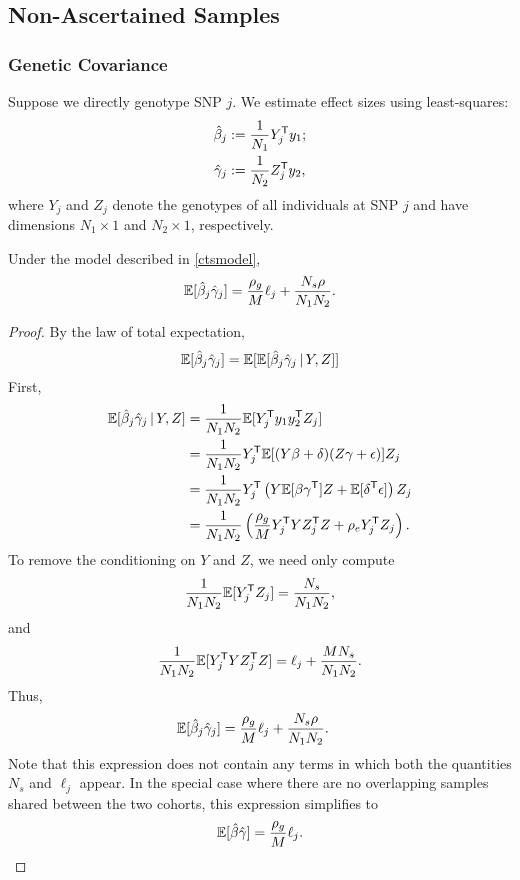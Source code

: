 \documentclass[11pt]{article}
\numberwithin{equation}{section}
\numberwithin{definition}{section}
\numberwithin{thm}{section}
\numberwithin{lemma}{section}
\numberwithin{prop}{section}
\numberwithin{cor}{section}
\numberwithin{hyp}{section}
\begin{document}
\subsection{Non-Ascertained Samples}
\subsubsection{Genetic Covariance}
\label{supp_condexp_qt}
Suppose we directly genotype SNP $j$. 
We estimate effect sizes using least-squares: 
\begin{align*}
	\hat{\beta}_j &:= \frac{1}{N_1}Y^{\mathsf{T}}_jy_1;\\
	\hat{\gamma}_j &:= \frac{1}{N_2}Z^{\mathsf{T}}_jy_2,
\end{align*}
where $Y_j$ and $Z_j$ denote the genotypes of all individuals at SNP $j$ 
and have dimensions $N_1\times 1$ and $N_2\times 1$, respectively.

\begin{prop} 
Under the model described in \ref{ctsmodel}, 
\begin{equation}
	\mathbb{E}[\hat{\beta}_j\hat{\gamma}_j] = \frac{\rho_g}{M}\ell_j  + \frac{N_s\rho}{N_1N_2}.
\end{equation}
\end{prop}

\begin{proof} By the law of total expectation, 
$$\mathbb{E}[\hat{\beta}_j\hat{\gamma}_j] = \mathbb{E}[ \mathbb{E}[\hat{\beta}_j\hat{\gamma}_j \,|\, Y, Z ] ]$$
\noindent
First,
\begin{align*}
	\mathbb{E}[\hat{\beta}_j\hat{\gamma}_j\,|\,Y,Z] &= \frac{1}{N_1N_2}\mathbb{E}[Y^{\mathsf{T}}_jy_1y_2^{\mathsf{T}}Z_j]   \\
       		&= \frac{1}{N_1N_2}Y^{\mathsf{T}}_j\mathbb{E}[{(Y\beta+\delta)}(Z\gamma+\epsilon)]Z_j\\
        		&= \frac{1}{N_1N_2}Y^{\mathsf{T}}_j\left(Y\mathbb{E}[\beta\gamma^{\mathsf{T}}]Z + \mathbb{E}[\delta^{\mathsf{T}}\epsilon]\right)Z_j\\
        		&= \frac{1}{N_1N_2}\left( \frac{\rho_g}{M} Y^{\mathsf{T}}_jYZ^{\mathsf{T}}_jZ  + \rho_eY^{\mathsf{T}}_jZ_j  \right).
\end{align*}
\noindent
To remove the conditioning on $Y$ and $Z$, we need only compute 
$$\frac{1}{N_1N_2}\mathbb{E}[Y^{\mathsf{T}}_jZ_j ] = \frac{N_s}{N_1N_2},$$ 
and 
$$\frac{1}{N_1N_2}\mathbb{E}[Y^{\mathsf{T}}_jYZ^{\mathsf{T}}_jZ] = \ell_j + \frac{MN_s}{N_1N_2}.$$
Thus, 
\begin{align*}
    \mathbb{E}[\hat{\beta}_j\hat{\gamma}_j] &= \frac{\rho_g}{M}\ell_j  + \frac{N_s\rho}{N_1N_2}.
\end{align*}
Note that this expression does not contain any terms in which both the quantities $N_s$ and $\ell_j$ appear. 
In the special case where there are no overlapping samples shared between the two cohorts, this expression simplifies to 
\begin{equation*}
	\mathbb{E}[\hat{\beta}\hat{\gamma}] = \frac{\rho_g}{M}\ell_j.
\end{equation*}
\end{proof}
\end{document}
